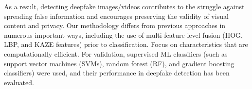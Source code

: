 As a result, detecting deepfake images/videos contributes to the struggle against spreading false information and encourages preserving the validity of visual content and privacy. Our methodology differs from previous approaches in numerous important ways, including the use of multi-feature-level fusion (HOG, LBP, and KAZE features) prior to classification. Focus on characteristics that are computationally efficient. For validation, supervised ML classifiers (such as support vector machines (SVMs), random forest (RF), and gradient boosting classifiers) were used, and their performance in deepfake detection has been evaluated.